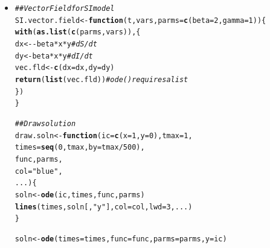 \documentclass[12pt]{article}\usepackage[]{graphicx}\usepackage[]{color}
\makeatletter
\newcommand{\hlnum}[1]{\textcolor[rgb]{0.686,0.059,0.569}{#1}}%
\newcommand{\hlstr}[1]{\textcolor[rgb]{0.192,0.494,0.8}{#1}}%
\newcommand{\hlcom}[1]{\textcolor[rgb]{0.678,0.584,0.686}{\textit{#1}}}%
\newcommand{\hlopt}[1]{\textcolor[rgb]{0,0,0}{#1}}%
\newcommand{\hlstd}[1]{\textcolor[rgb]{0.345,0.345,0.345}{#1}}%
\newcommand{\hlkwa}[1]{\textcolor[rgb]{0.161,0.373,0.58}{\textbf{#1}}}%
\newcommand{\hlkwb}[1]{\textcolor[rgb]{0.69,0.353,0.396}{#1}}%
\newcommand{\hlkwc}[1]{\textcolor[rgb]{0.333,0.667,0.333}{#1}}%
\newcommand{\hlkwd}[1]{\textcolor[rgb]{0.737,0.353,0.396}{\textbf{#1}}}%
\newenvironment{kframe}{%
 \def\at@end@of@kframe{}%
 \ifinner\ifhmode%
  \def\at@end@of@kframe{\end{minipage}}%
  \begin{minipage}{\columnwidth}%
 \fi\fi%
 \def\FrameCommand##1{\hskip\@totalleftmargin \hskip-\fboxsep
 \colorbox{shadecolor}{##1}\hskip-\fboxsep
     \hskip-\linewidth \hskip-\@totalleftmargin \hskip\columnwidth}%
 \MakeFramed {\advance\hsize-\width
   \@totalleftmargin\z@ \linewidth\hsize
   \@setminipage}}%
 {\par\unskip\endMakeFramed%
 \at@end@of@kframe}
\newenvironment{knitrout}{}{} %
\makeatother
\begin{document}
\begin{enumerate}[(a)]
\begin{itemize}
\begin{knitrout}
\end{knitrout}
  \item \FitSIRbiiiA
\begin{knitrout}
\color{fgcolor}\begin{kframe}
\begin{alltt}
\hlcom{## Vector Field for SI model}
\hlstd{SI.vector.field} \hlkwb{<-} \hlkwa{function}\hlstd{(}\hlkwc{t}\hlstd{,} \hlkwc{vars}\hlstd{,} \hlkwc{parms}\hlstd{=}\hlkwd{c}\hlstd{(}\hlkwc{beta}\hlstd{=}\hlnum{2}\hlstd{,}\hlkwc{gamma}\hlstd{=}\hlnum{1}\hlstd{)) \{}
  \hlkwd{with}\hlstd{(}\hlkwd{as.list}\hlstd{(}\hlkwd{c}\hlstd{(parms, vars)), \{}
    \hlstd{dx} \hlkwb{<-} \hlopt{-}\hlstd{beta}\hlopt{*}\hlstd{x}\hlopt{*}\hlstd{y} \hlcom{# dS/dt}
    \hlstd{dy} \hlkwb{<-} \hlstd{beta}\hlopt{*}\hlstd{x}\hlopt{*}\hlstd{y}  \hlcom{# dI/dt}
    \hlstd{vec.fld} \hlkwb{<-} \hlkwd{c}\hlstd{(}\hlkwc{dx}\hlstd{=dx,} \hlkwc{dy}\hlstd{=dy)}
    \hlkwd{return}\hlstd{(}\hlkwd{list}\hlstd{(vec.fld))} \hlcom{# ode() requires a list}
  \hlstd{\})}
\hlstd{\}}
\end{alltt}
\end{kframe}
\end{knitrout}

\FitSIRbiiiB
\begin{knitrout}
\color{fgcolor}\begin{kframe}
\begin{alltt}
\hlcom{## Draw solution}
\hlstd{draw.soln} \hlkwb{<-} \hlkwa{function}\hlstd{(}\hlkwc{ic}\hlstd{=}\hlkwd{c}\hlstd{(}\hlkwc{x}\hlstd{=}\hlnum{1}\hlstd{,}\hlkwc{y}\hlstd{=}\hlnum{0}\hlstd{),} \hlkwc{tmax}\hlstd{=}\hlnum{1}\hlstd{,}
                      \hlkwc{times}\hlstd{=}\hlkwd{seq}\hlstd{(}\hlnum{0}\hlstd{,tmax,}\hlkwc{by}\hlstd{=tmax}\hlopt{/}\hlnum{500}\hlstd{),}
                      \hlkwc{func}\hlstd{,} \hlkwc{parms}\hlstd{,}
                      \hlkwc{col}\hlstd{=}\hlstr{"blue"}\hlstd{,}
                      \hlkwc{...} \hlstd{) \{}
  \hlstd{soln} \hlkwb{<-} \hlkwd{ode}\hlstd{(ic, times, func, parms)}
  \hlkwd{lines}\hlstd{(times, soln[,}\hlstr{"y"}\hlstd{],} \hlkwc{col}\hlstd{=col,} \hlkwc{lwd}\hlstd{=}\hlnum{3}\hlstd{, ... )}
\hlstd{\}}
\end{alltt}
\end{kframe}
\end{knitrout}
\FitSIRbiiiC
\begin{knitrout}
\color{fgcolor}\begin{kframe}
\begin{alltt}
\hlstd{soln} \hlkwb{<-} \hlkwd{ode}\hlstd{(}\hlkwc{times}\hlstd{=times,} \hlkwc{func}\hlstd{=func,} \hlkwc{parms}\hlstd{=parms,} \hlkwc{y}\hlstd{=ic)}
\end{alltt}
\end{kframe}
\end{knitrout}


\end{itemize}
\end{enumerate}
\end{document}
